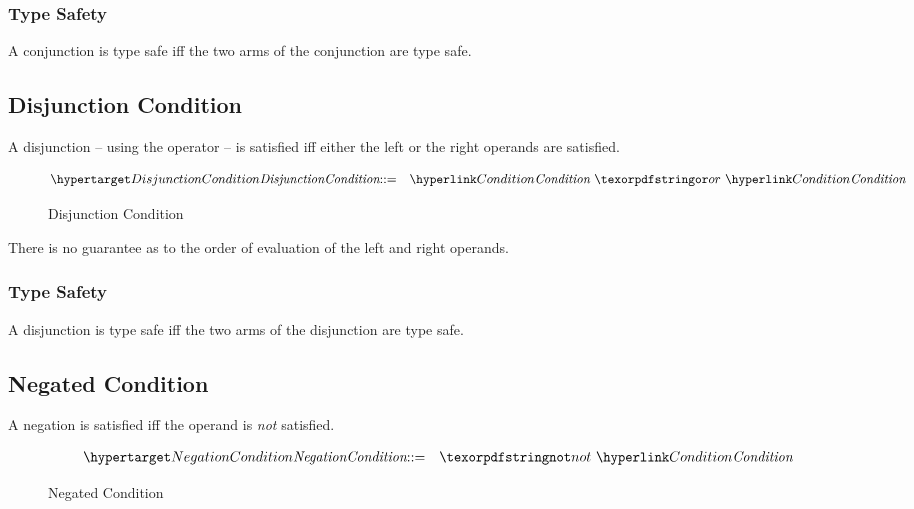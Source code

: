 \subsubsection{Type Safety}
A conjunction is type safe iff the two arms of the conjunction are type safe.
\begin{prooftree}
\end{prooftree}

\subsection{Disjunction Condition}
\label{disjunction}
A disjunction -- using the  operator -- is satisfied iff either the left or the right operands are satisfied.

\begin{figure}[htbp]
\begin{eqnarray*}
\ntDef{DisjunctionCondition}&\arrow&\ntRef{Condition}\ \q{or}\ \ntRef{Condition}
\end{eqnarray*}
\caption{Disjunction Condition}
\label{disjunctionConditionFormFig}
\end{figure}

\begin{aside}
There is no guarantee as to the order of evaluation of the left and right operands.
\end{aside}

\subsubsection{Type Safety}
A disjunction is type safe iff the two arms of the disjunction are type safe.
\begin{prooftree}
\end{prooftree}

\subsection{Negated Condition}
A negation is satisfied iff the operand is \emph{not} satisfied.


\begin{figure}[htbp]
\begin{eqnarray*}
\ntDef{NegationCondition}&\arrow&\q{not}\ \ntRef{Condition}
\end{eqnarray*}
\caption{Negated Condition}
\label{negationConditionFormFig}
\end{figure}

